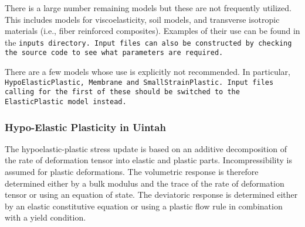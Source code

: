 There is a large number remaining models but these are not frequently utilized. 
This includes models for viscoelasticity, soil models, and transverse isotropic materials (i.e., fiber reinforced composites).
Examples of their use can be found in the \tt inputs \normalfont directory.
Input files can also be constructed by checking the source code to see
what parameters are required.

There are a few models whose use is explicitly not recommended.  In particular,
\tt HypoElasticPlastic, Membrane and SmallStrainPlastic. \normalfont  Input
files calling for the first of these should be switched to the
\tt ElasticPlastic \normalfont model instead.

\subsubsection{Hypo-Elastic Plasticity in Uintah}  \label{Sec:ElasticPlastic}

The hypoelastic-plastic stress update is based on an additive
decomposition of the rate of deformation tensor into elastic
and plastic parts.  Incompressibility is assumed
for plastic deformations.  The volumetric response is therefore
determined either by a bulk modulus and the trace of the rate
of deformation tensor or using an equation of state.  The
deviatoric response is determined either by an elastic constitutive
equation or using a plastic flow rule in combination with a
yield condition.

